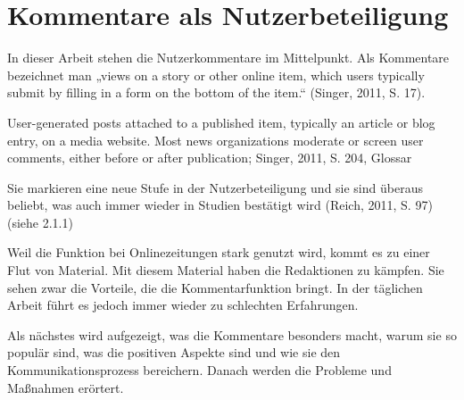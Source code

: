 

\chapter{Kommentare als Nutzerbeteiligung}

In dieser Arbeit stehen die Nutzerkommentare im Mittelpunkt. Als Kommentare
bezeichnet man „views on a story or other online item, which users typically
submit by filling in a form on the bottom of the item.“ (Singer, 2011, S. 17).


User-generated posts attached to a published item, typically an article or blog
entry, on a media website. Most news organizations moderate or screen user
comments, either before or after publication; Singer, 2011, S. 204, Glossar

Sie markieren eine neue Stufe in der Nutzerbeteiligung und sie sind überaus
beliebt, was auch immer wieder in Studien bestätigt wird (Reich, 2011, S. 97)
(siehe 2.1.1)

Weil die Funktion bei Onlinezeitungen stark genutzt wird, kommt es zu einer Flut
von Material. Mit diesem Material haben die Redaktionen zu kämpfen. Sie sehen
zwar die Vorteile, die die Kommentarfunktion bringt. In der täglichen Arbeit
führt es jedoch immer wieder zu schlechten Erfahrungen.

Als nächstes wird aufgezeigt, was die Kommentare besonders macht, warum sie so
populär sind, was die positiven Aspekte sind und wie sie den
Kommunikationsprozess bereichern. Danach werden die Probleme und Maßnahmen
erörtert.

